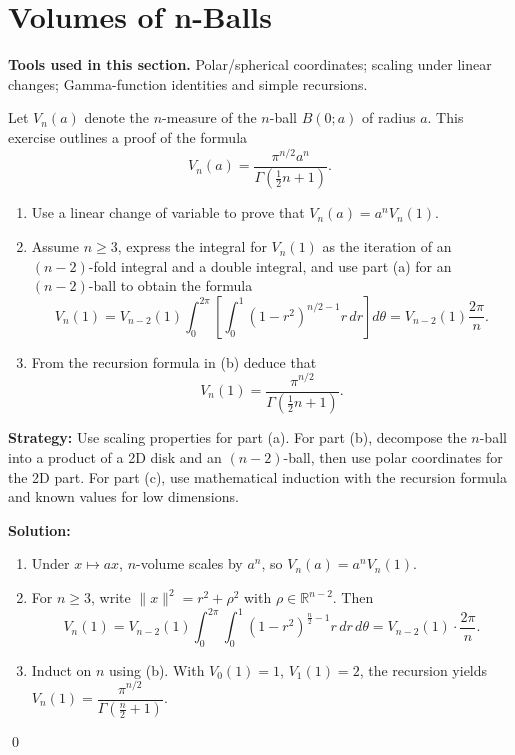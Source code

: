 \section{Volumes of n-Balls}

\noindent\textbf{Tools used in this section.} Polar/spherical coordinates; scaling under linear changes; Gamma-function identities and simple recursions.



\begin{problembox}
Let \( V_n(a) \) denote the \( n \)-measure of the \( n \)-ball \( B(0; a) \) of radius \( a \). This exercise outlines a proof of the formula
\[
V_n(a) = \frac{\pi^{n/2} a^n}{\Gamma( \frac{1}{2} n + 1 )}.
\]
\begin{enumerate}[label=(\alph*)]
\item Use a linear change of variable to prove that \( V_n(a) = a^n V_n(1) \).
\item Assume \( n \geq 3 \), express the integral for \( V_n(1) \) as the iteration of an \( (n - 2) \)-fold integral and a double integral, and use part (a) for an \( (n - 2) \)-ball to obtain the formula
\[
V_n(1) = V_{n-2}(1) \int_0^{2\pi} \left[ \int_0^1 (1 - r^2)^{n/2 - 1}r \, dr \right] d\theta = V_{n-2}(1) \frac{2\pi}{n}.
\]
\item From the recursion formula in (b) deduce that
\[
V_n(1) = \frac{\pi^{n/2}}{\Gamma(\frac{1}{2}n + 1)}.
\]
\end{enumerate}
\end{problembox}

\noindent\textbf{Strategy:} Use scaling properties for part (a). For part (b), decompose the \(n\)-ball into a product of a 2D disk and an \((n-2)\)-ball, then use polar coordinates for the 2D part. For part (c), use mathematical induction with the recursion formula and known values for low dimensions.

\bigskip\noindent\textbf{Solution:}
\begin{enumerate}[label=(\alph*)]
\item Under \(x\mapsto ax\), \(n\)-volume scales by \(a^n\), so \(V_n(a)=a^n V_n(1)\).
\item For \(n\ge 3\), write \(\|x\|^2=r^2+\rho^2\) with \(\rho\in\mathbb{R}^{n-2}\). Then
\[
V_n(1)=V_{n-2}(1)\int_0^{2\pi}\!\int_0^1 (1-r^2)^{\frac{n}{2}-1} r\,dr\,d\theta = V_{n-2}(1)\cdot \frac{2\pi}{n}.
\]
\item Induct on \(n\) using (b). With \(V_0(1)=1\), \(V_1(1)=2\), the recursion yields \(V_n(1)=\dfrac{\pi^{n/2}}{\Gamma(\tfrac{n}{2}+1)}\).
\end{enumerate}\qed


